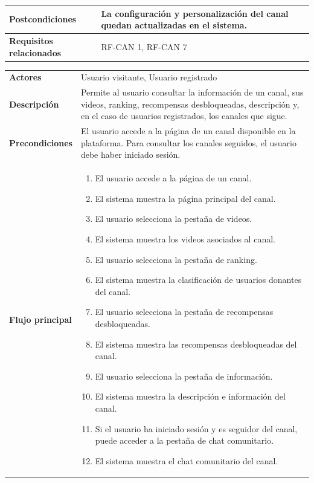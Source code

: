 \begin{longtable}{|p{}|p{}|}
\textbf{Postcondiciones} & La configuración y personalización del canal quedan actualizadas en el sistema. \\
\hline
\textbf{Requisitos relacionados} & RF-CAN 1, RF-CAN 7 \\
\hline
\end{longtable}


\begin{longtable}{|p{}|p{}|}
\hline
\rowcolor[gray]{0.75}
\multicolumn{2}{|c|}{\textbf{Caso de uso: Consultar canal y canales seguidos}} \\
\hline
\textbf{Actores} & Usuario visitante, Usuario registrado \\
\hline
\textbf{Descripción} & Permite al usuario consultar la información de un canal, sus videos, ranking, recompensas desbloqueadas, descripción y, en el caso de usuarios registrados, los canales que sigue. \\
\hline
\textbf{Precondiciones} & El usuario accede a la página de un canal disponible en la plataforma. Para consultar los canales seguidos, el usuario debe haber iniciado sesión. \\
\hline
\textbf{Flujo principal} &
\begin{enumerate}
    \item El usuario accede a la página de un canal.
    \item El sistema muestra la página principal del canal.
    \item El usuario selecciona la pestaña de videos.
    \item El sistema muestra los videos asociados al canal.
    \item El usuario selecciona la pestaña de ranking.
    \item El sistema muestra la clasificación de usuarios donantes del canal.
    \item El usuario selecciona la pestaña de recompensas desbloqueadas.
    \item El sistema muestra las recompensas desbloqueadas del canal.
    \item El usuario selecciona la pestaña de información.
    \item El sistema muestra la descripción e información del canal.
    \item Si el usuario ha iniciado sesión y es seguidor del canal, puede acceder a la pestaña de chat comunitario.
    \item El sistema muestra el chat comunitario del canal.
\end{enumerate} \\
\hline


\end{longtable}
